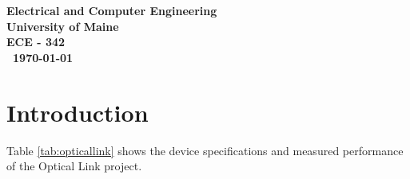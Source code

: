 \documentclass{article}
\begin{document}
\begin{titlepage}
\begin{center}
\begin{abstract}
        
        
        
        \end{abstract}
        
        
        \vspace{02.5cm}
        \textbf{
        Electrical and Computer Engineering\\
        University of Maine\\
        ECE - 342\\\ \today}
    \vspace{.5cm}
    
    \end{center}
\end{titlepage}


\clearpage




\section{Introduction}


Table \ref{tab:opticallink} shows the device specifications and measured performance of the Optical Link project.
\end{document}
